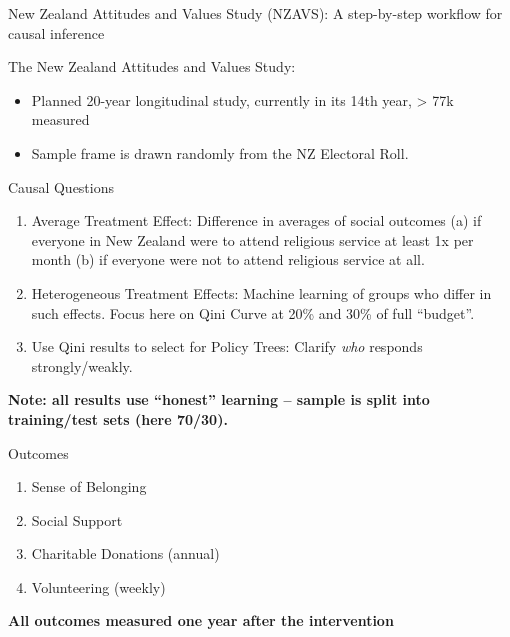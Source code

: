 \documentclass[
  ignorenonframetext,
  aspectratio=169,
]{beamer}
\providecommand{\tightlist}{%
  \setlength{\itemsep}{0pt}\setlength{\parskip}{0pt}}
\begin{document}
\begin{frame}[fragile]{New Zealand Attitudes and Values Study (NZAVS): A
step-by-step workflow for causal inference}
\label{new-zealand-attitudes-and-values-study-nzavs-a-step-by-step-workflow-for-causal-inference}
\begin{block}{The New Zealand Attitudes and Values Study:}
\label{the-new-zealand-attitudes-and-values-study}
\begin{itemize}
\item
  Planned 20-year longitudinal study, currently in its 14th year,
  \textgreater{} 77k measured
\item
  Sample frame is drawn randomly from the NZ Electoral Roll.
\end{itemize}
\end{block}

\begin{block}{Causal Questions}
\label{causal-questions}
\begin{enumerate}
[1)]
\item
  Average Treatment Effect: Difference in averages of social outcomes
  (a) if everyone in New Zealand were to attend religious service at
  least 1x per month (b) if everyone were not to attend religious
  service at all.
\item
  Heterogeneous Treatment Effects: Machine learning of groups who differ
  in such effects. Focus here on Qini Curve at 20\% and 30\% of full
  ``budget''.
\item
  Use Qini results to select for Policy Trees: Clarify \emph{who}
  responds strongly/weakly.
\end{enumerate}

\textbf{Note: all results use ``honest'' learning -- sample is split
into training/test sets (here 70/30).}
\end{block}

\begin{block}{Outcomes}
\label{outcomes}
\begin{enumerate}
\tightlist
\item
  Sense of Belonging
\item
  Social Support
\item
  Charitable Donations (annual)
\item
  Volunteering (weekly)
\end{enumerate}

\textbf{All outcomes measured one year after the intervention}
\end{block}


\end{frame}
\end{document}
